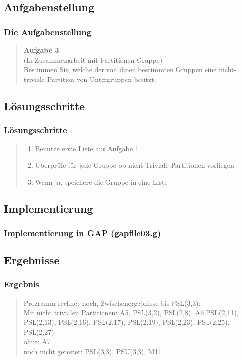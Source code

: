 \documentclass{beamer}
\begin{document}
\subsection{Aufgabenstellung}

\begin{frame}
	\frametitle{Die Aufgabenstellung}
	\begin{quote}
	\textbf{Aufgabe 3}:\\
	(In Zusammenarbeit mit Partitionen-Gruppe)\\
	Bestimmen Sie, welche der von ihnen bestimmten Gruppen eine nicht-triviale Partition von Untergruppen besitzt.

	\end{quote}
\end{frame}
\subsection{Lösungsschritte}

\begin{frame}
	\frametitle{Lösungsschritte}
	\begin{quote}
	 \begin{enumerate}
	  \item Benutze erste Liste aus Aufgabe 1
	  \item Überprüfe für jede Gruppe ob nicht Triviale Partitionen vorliegen
	  \item Wenn ja, speichere die Gruppe in eine Liste
	 \end{enumerate}

		 
	\end{quote}
\end{frame}
\subsection{Implementierung}

\begin{frame}
	\frametitle{Implementierung in GAP (gapfile03.g)}
	\begin{quote}
	 

		 
	\end{quote}
\end{frame}
\subsection{Ergebnisse}

\begin{frame}
	\frametitle{Ergebnis}
	\begin{quote}
	 Programm rechnet noch, Zwischenergebnisse bis PSL(3,3):\\
	 Mit nicht trivialen Partitionen: A5, PSL(3,2), PSL(2,8), A6 PSL(2,11), PSL(2,13), PSL(2,16), PSL(2,17), PSL(2,19), PSL(2,23), PSL(2,25), PSL(2,27)  \\
	 ohne: A7\\
	 noch nicht getestet: PSL(3,3), PSU(3,3), M11
	 
	 
		 
	\end{quote}
\end{frame}
\end{document}
